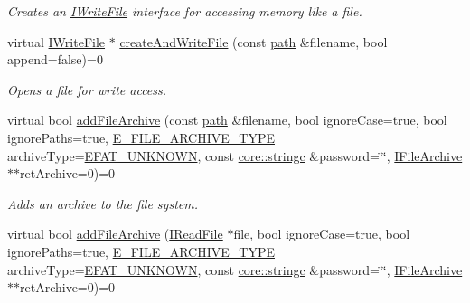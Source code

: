 \begin{DoxyCompactItemize}
\begin{DoxyCompactList}\small\item\em Creates an \hyperlink{classirr_1_1io_1_1IWriteFile}{I\+Write\+File} interface for accessing memory like a file. \end{DoxyCompactList}\item 
virtual \hyperlink{classirr_1_1io_1_1IWriteFile}{I\+Write\+File} $\ast$ \hyperlink{classirr_1_1io_1_1IFileSystem_af0ed28b697936ee8aa60a5a0877ac90a}{create\+And\+Write\+File} (const \hyperlink{namespaceirr_1_1io_ab1bdc45edb3f94d8319c02bc0f840ee1}{path} \&filename, bool append=false)=0
\begin{DoxyCompactList}\small\item\em Opens a file for write access. \end{DoxyCompactList}\item 
virtual bool \hyperlink{classirr_1_1io_1_1IFileSystem_afe6641c7f88a8fea0205c113b8379730}{add\+File\+Archive} (const \hyperlink{namespaceirr_1_1io_ab1bdc45edb3f94d8319c02bc0f840ee1}{path} \&filename, bool ignore\+Case=true, bool ignore\+Paths=true, \hyperlink{namespaceirr_1_1io_adb3e3c445ec8e608ed1f0f93306da14f}{E\+\_\+\+F\+I\+L\+E\+\_\+\+A\+R\+C\+H\+I\+V\+E\+\_\+\+T\+Y\+PE} archive\+Type=\hyperlink{namespaceirr_1_1io_adb3e3c445ec8e608ed1f0f93306da14fa2c2aea9bc955ae4e0d29071ba66ff8dc}{E\+F\+A\+T\+\_\+\+U\+N\+K\+N\+O\+WN}, const \hyperlink{namespaceirr_1_1core_ade1071a878633f2f6d8a75c5d11fec19}{core\+::stringc} \&password=\char`\"{}\char`\"{}, \hyperlink{classirr_1_1io_1_1IFileArchive}{I\+File\+Archive} $\ast$$\ast$ret\+Archive=0)=0
\begin{DoxyCompactList}\small\item\em Adds an archive to the file system. \end{DoxyCompactList}\item 
virtual bool \hyperlink{classirr_1_1io_1_1IFileSystem_abe4d01069e7fbf0fa871197a68ad87b9}{add\+File\+Archive} (\hyperlink{classirr_1_1io_1_1IReadFile}{I\+Read\+File} $\ast$file, bool ignore\+Case=true, bool ignore\+Paths=true, \hyperlink{namespaceirr_1_1io_adb3e3c445ec8e608ed1f0f93306da14f}{E\+\_\+\+F\+I\+L\+E\+\_\+\+A\+R\+C\+H\+I\+V\+E\+\_\+\+T\+Y\+PE} archive\+Type=\hyperlink{namespaceirr_1_1io_adb3e3c445ec8e608ed1f0f93306da14fa2c2aea9bc955ae4e0d29071ba66ff8dc}{E\+F\+A\+T\+\_\+\+U\+N\+K\+N\+O\+WN}, const \hyperlink{namespaceirr_1_1core_ade1071a878633f2f6d8a75c5d11fec19}{core\+::stringc} \&password=\char`\"{}\char`\"{}, \hyperlink{classirr_1_1io_1_1IFileArchive}{I\+File\+Archive} $\ast$$\ast$ret\+Archive=0)=0

\end{DoxyCompactItemize}
